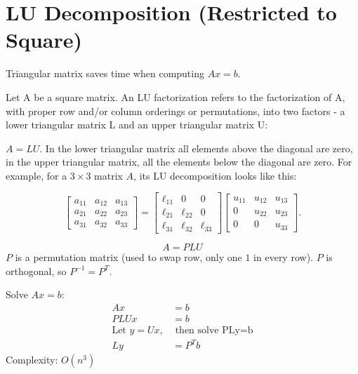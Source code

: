 \documentclass[11pt]{elegantbook}
\begin{document}
\section{LU Decomposition (Restricted to Square)}
Triangular matrix saves time when computing $Ax=b$.

Let A be a square matrix. An LU factorization refers to the factorization of A, with proper row and/or column orderings or permutations, into two factors - a lower triangular matrix L and an upper triangular matrix U:

${\displaystyle A=LU.}$
In the lower triangular matrix all elements above the diagonal are zero, in the upper triangular matrix, all the elements below the diagonal are zero. For example, for a $3 \times 3$ matrix $A$, its LU decomposition looks like this:

$${\displaystyle {\begin{bmatrix}a_{11}&a_{12}&a_{13}\\a_{21}&a_{22}&a_{23}\\a_{31}&a_{32}&a_{33}\end{bmatrix}}={\begin{bmatrix}\ell _{11}&0&0\\\ell _{21}&\ell _{22}&0\\\ell _{31}&\ell _{32}&\ell _{33}\end{bmatrix}}{\begin{bmatrix}u_{11}&u_{12}&u_{13}\\0&u_{22}&u_{23}\\0&0&u_{33}\end{bmatrix}}.}$$

$$A=PLU$$
$P$ is a permutation matrix (used to swap row, only one $1$ in every row). $P$ is orthogonal, so $P^{-1}=P^T$.

Solve $Ax=b$:
\begin{equation}
    \begin{aligned}
        Ax&=b\\
        PLUx&=b\\
        \text{Let }y=Ux,&\text{ then solve PLy=b}\\
        Ly&=P^Tb
    \end{aligned}
    \nonumber
\end{equation}
Complexity: $O(n^3)$
\end{document}
